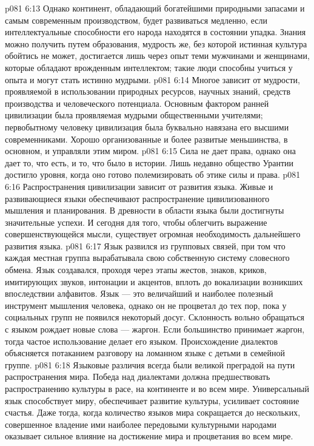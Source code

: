 \vs p081 6:13 Однако континент, обладающий богатейшими природными запасами и самым современным производством, будет развиваться медленно, если интеллектуальные способности его народа находятся в состоянии упадка. Знания можно получить путем образования, мудрость же, без которой истинная культура обойтись не может, достигается лишь через опыт теми мужчинами и женщинами, которые обладают врожденным интеллектом; такие люди способны учиться у опыта и могут стать истинно мудрыми.
\vs p081 6:14 \bibnobreakspace {} Многое зависит от мудрости, проявляемой в использовании природных ресурсов, научных знаний, средств производства и человеческого потенциала. Основным фактором ранней цивилизации была  проявляемая мудрыми общественными учителями; первобытному человеку цивилизация была буквально навязана его высшими современниками. Хорошо организованные и более развитые меньшинства, в основном, и управляли этим миром.
\vs p081 6:15 Сила не дает права, однако она дает то, что есть, и то, что было в истории. Лишь недавно общество Урантии достигло уровня, когда оно готово полемизировать об этике силы и права.
\vs p081 6:16 \bibnobreakspace {} Распространения цивилизации зависит от развития языка. Живые и развивающиеся языки обеспечивают распространение цивилизованного мышления и планирования. В древности в области языка были достигнуты значительные успехи. И сегодня для того, чтобы облегчить выражение совершенствующейся мысли, существует огромная необходимость дальнейшего развития языка.
\vs p081 6:17 Язык развился из групповых связей, при том что каждая местная группа вырабатывала свою собственную систему словесного обмена. Язык создавался, проходя через этапы жестов, знаков, криков, имитирующих звуков, интонации и акцентов, вплоть до вокализации возникших впоследствии алфавитов. Язык --- это величайший и наиболее полезный инструмент мышления человека, однако он не процветал до тех пор, пока у социальных групп не появился некоторый досуг. Склонность вольно обращаться с языком рождает новые слова --- жаргон. Если большинство принимает жаргон, тогда частое использование делает его языком. Происхождение диалектов объясняется потаканием разговору на ломанном языке с детьми в семейной группе.
\vs p081 6:18 Языковые различия всегда были великой преградой на пути распространения мира. Победа над диалектами должна предшествовать распространению культуры в расе, на континенте и во всем мире. Универсальный язык способствует миру, обеспечивает развитие культуры, усиливает состояние счастья. Даже тогда, когда количество языков мира сокращается до нескольких, совершенное владение ими наиболее передовыми культурными народами оказывает сильное влияние на достижение мира и процветания во всем мире.
